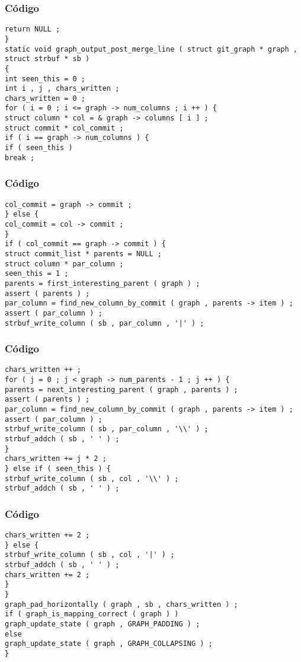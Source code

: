 \documentclass{beamer}
\begin{document}
\begin{frame}[fragile]
\frametitle{C\'odigo}
\begin{verbatim}
return NULL ; 
} 
static void graph_output_post_merge_line ( struct git_graph * graph , struct strbuf * sb ) 
{ 
int seen_this = 0 ; 
int i , j , chars_written ; 
chars_written = 0 ; 
for ( i = 0 ; i <= graph -> num_columns ; i ++ ) { 
struct column * col = & graph -> columns [ i ] ; 
struct commit * col_commit ; 
if ( i == graph -> num_columns ) { 
if ( seen_this ) 
break ; 
\end{verbatim}
\end{frame}
\begin{frame}[fragile]
\frametitle{C\'odigo}
\begin{verbatim}
col_commit = graph -> commit ; 
} else { 
col_commit = col -> commit ; 
} 
if ( col_commit == graph -> commit ) { 
struct commit_list * parents = NULL ; 
struct column * par_column ; 
seen_this = 1 ; 
parents = first_interesting_parent ( graph ) ; 
assert ( parents ) ; 
par_column = find_new_column_by_commit ( graph , parents -> item ) ; 
assert ( par_column ) ; 
strbuf_write_column ( sb , par_column , '|' ) ; 
\end{verbatim}
\end{frame}
\begin{frame}[fragile]
\frametitle{C\'odigo}
\begin{verbatim}
chars_written ++ ; 
for ( j = 0 ; j < graph -> num_parents - 1 ; j ++ ) { 
parents = next_interesting_parent ( graph , parents ) ; 
assert ( parents ) ; 
par_column = find_new_column_by_commit ( graph , parents -> item ) ; 
assert ( par_column ) ; 
strbuf_write_column ( sb , par_column , '\\' ) ; 
strbuf_addch ( sb , ' ' ) ; 
} 
chars_written += j * 2 ; 
} else if ( seen_this ) { 
strbuf_write_column ( sb , col , '\\' ) ; 
strbuf_addch ( sb , ' ' ) ; 
\end{verbatim}
\end{frame}
\begin{frame}[fragile]
\frametitle{C\'odigo}
\begin{verbatim}
chars_written += 2 ; 
} else { 
strbuf_write_column ( sb , col , '|' ) ; 
strbuf_addch ( sb , ' ' ) ; 
chars_written += 2 ; 
} 
} 
graph_pad_horizontally ( graph , sb , chars_written ) ; 
if ( graph_is_mapping_correct ( graph ) ) 
graph_update_state ( graph , GRAPH_PADDING ) ; 
else 
graph_update_state ( graph , GRAPH_COLLAPSING ) ; 
} 
\end{verbatim}
\end{frame}
\end{document}
